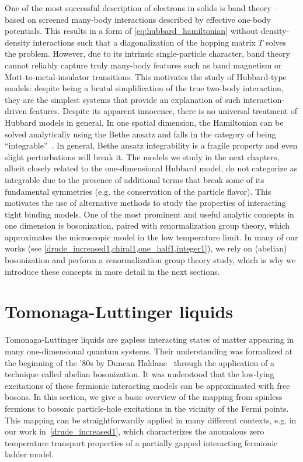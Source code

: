 One of the most successful description of electrons in solids is band theory -- based on screened many-body interactions described by effective one-body potentials.
This results in a form of \cref{eq:hubbard_hamiltonian} without density-density interactions such that a diagonalization of the hopping matrix $T$ solves the problem.
However, due to its intrinsic single-particle character, band theory cannot reliably capture truly many-body features such as band magnetism or Mott-to-metal-insulator transitions.
This motivates the study of Hubbard-type models: despite being a brutal simplification of the true two-body interaction, they are the simplest systems that provide an explanation of such interaction-driven features.
Despite its apparent innocence, there is no universal treatment of Hubbard models in general.
In one spatial dimension, the Hamiltonian can be solved analytically using the Bethe ansatz and falls in the category of being ``integrable''~\cite{Essler2005}.
In general, Bethe ansatz integrability is a fragile property and even slight perturbations will break it.
The models we study in the next chapters, albeit closely related to the one-dimensional Hubbard model, do not categorize as integrable due to the presence of additional terms that break some of its fundamental symmetries (e.g. the conservation of the particle flavor).
This motivates the use of alternative methods to study the properties of interacting tight binding models.
One of the most prominent and useful analytic concepts in one dimension is bosonization, paired with renormalization group theory, which approximates the microscopic model in the low temperature limit.
In many of our works (see \cref{drude_increased1,chiral1,one_half1,integer1}), we rely on (abelian) bosonization and perform a renormalization group theory study, which is why we introduce these concepts in more detail in the next sections.
%
%
\section{Tomonaga-Luttinger liquids}
\label{sec:tomonaga_LL}
Tomonaga-Luttinger liquids are gapless interacting states of matter appearing in many one-dimensional quantum systems.
Their understanding was formalized at the beginning of the '80s by Duncan Haldane~\cite{Haldane1981} through the application of a technique called abelian bosonization.
It was understood that the low-lying excitations of these fermionic interacting models can be approximated with free bosons.
In this section, we give a basic overview of the mapping from spinless fermions to bosonic particle-hole excitations in the vicinity of the Fermi points.
This mapping can be straightforwardly applied in many different contexts, e.g. in our work in~\cref{drude_increased1}, which characterizes the anomalous zero temperature transport properties of a partially gapped interacting fermionic ladder model.

